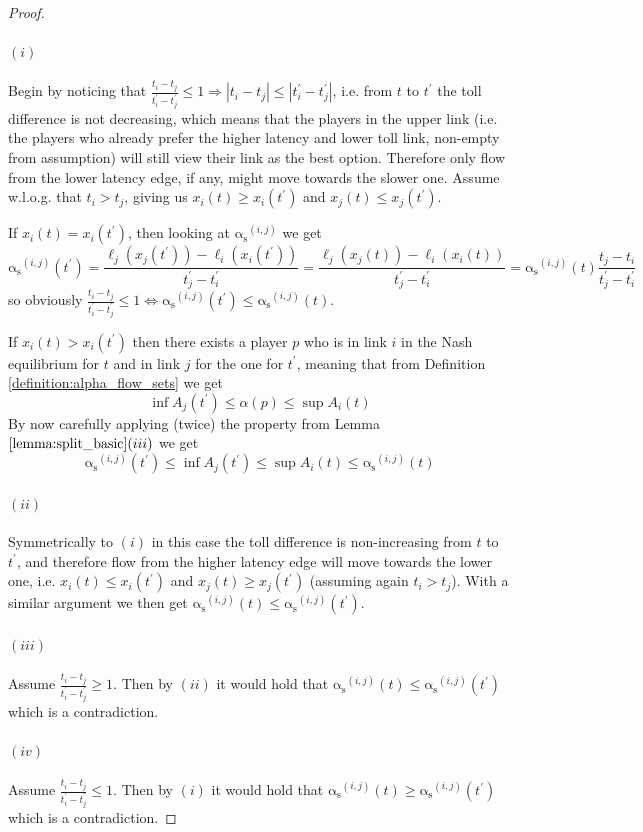 \documentclass[10pt,a4paper]{book}
\newcommand{\as}{\mathrm{\alpha_s}}
\theoremstyle{definition}
\theoremstyle{comment}
\begin{document}
\begin{proof}
	$ $
	\paragraph{$(i)$}
	Begin by noticing that $\frac{t_i - t_j}{t_i^\prime - t_j^\prime} \le 1 \Rightarrow |t_i - t_j| \le |t_i^\prime - t_j^\prime|$, i.e. from $t$ to $t^\prime$ the toll difference is not decreasing, which means that the players in the upper link (i.e. the players who already prefer the higher latency and lower toll link, non-empty from assumption) will still view their link as the best option.
	Therefore only flow from the lower latency edge, if any, might move towards the slower one.
	Assume w.l.o.g. that $t_i > t_j$, giving us $x_i(t) \ge x_i(t^\prime)$ and $x_j(t) \le x_j(t^\prime)$.

	If $x_i(t) = x_i(t^\prime)$, then looking at $\as^{(i, j)}$ we get
	\[\as^{(i, j)}(t^\prime) = \frac{\ell_j(x_j(t^\prime)) - \ell_i(x_i(t^\prime))}{t_j^\prime - t_i^\prime} = \frac{\ell_j(x_j(t)) - \ell_i(x_i(t))}{t_j^\prime - t_i^\prime} = \as^{(i, j)}(t) \frac{t_j - t_i}{t_j^\prime - t_i^\prime}\]
	so obviously $\frac{t_i - t_j}{t_i^\prime - t_j^\prime} \le 1 \Leftrightarrow \as^{(i, j)}(t^\prime) \le \as^{(i, j)}(t)$.

	If $x_i(t) > x_i(t^\prime)$ then there exists a player $p$ who is in link $i$ in the Nash equilibrium for $t$ and in link $j$ for the one for $t^\prime$, meaning that from Definition \ref{definition:alpha_flow_sets} we get
	\[\inf A_j(t^\prime) \le \alpha(p) \le \sup A_i(t)\]
	By now carefully applying  (twice) the property from Lemma $\ref{lemma:split_basic}(iii)$ we get
	\[\as^{(i, j)}(t^\prime) \le \inf A_j(t^\prime) \le \sup A_i(t) \le \as^{(i, j)}(t)\]

	\paragraph{$(ii)$}
	Symmetrically to $(i)$ in this case the toll difference is non-increasing from $t$ to $t^\prime$, and therefore flow from the higher latency edge will move towards the lower one, i.e. $x_i(t) \le x_i(t^\prime)$ and $x_j(t) \ge x_j(t^\prime)$ (assuming again $t_i > t_j$).
	With a similar argument we then get $\as^{(i, j)}(t) \le \as^{(i, j)}(t^\prime)$.

	\paragraph{$(iii)$}
	Assume $\frac{t_i - t_j}{t_i^\prime - t_j^\prime} \ge 1$.
	Then by $(ii)$ it would hold that $\as^{(i, j)}(t) \le \as^{(i, j)}(t^\prime)$ which is a contradiction.

	\paragraph{$(iv)$}
	Assume $\frac{t_i - t_j}{t_i^\prime - t_j^\prime} \le 1$.
	Then by $(i)$ it would hold that $\as^{(i, j)}(t) \ge \as^{(i, j)}(t^\prime)$ which is a contradiction.
\end{proof}
\end{document}
